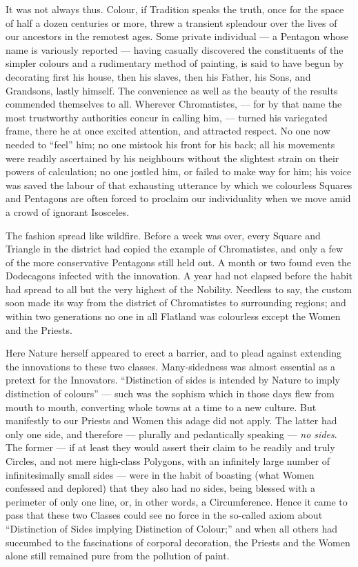 \documentclass[10pt, kindle, oneside]{kindle}
\begin{document}
It was not always thus. Colour, if Tradition speaks the truth, once for the
space of half a dozen centuries or more, threw a transient splendour over the
lives of our ancestors in the remotest ages. Some private individual --- a
Pentagon whose name is variously reported --- having casually discovered the
constituents of the simpler colours and a rudimentary method of painting, is
said to have begun by decorating first his house, then his slaves, then his
Father, his Sons, and Grandsons, lastly himself. The convenience as well as
the beauty of the results commended themselves to all. Wherever Chromatistes,
--- for by that name the most trustworthy authorities concur in calling him, ---
turned his variegated frame, there he at once excited attention, and attracted
respect. No one now needed to ``feel'' him; no one mistook his front for his
back; all his movements were readily ascertained by his neighbours without the
slightest strain on their powers of calculation; no one jostled him, or failed
to make way for him; his voice was saved the labour of that exhausting
utterance by which we colourless Squares and Pentagons are often forced to
proclaim our individuality when we move amid a crowd of ignorant Isosceles.

The fashion spread like wildfire. Before a week was over, every Square and
Triangle in the district had copied the example of Chromatistes, and only a
few of the more conservative Pentagons still held out. A month or two found
even the Dodecagons infected with the innovation. A year had not elapsed
before the habit had spread to all but the very highest of the Nobility.
Needless to say, the custom soon made its way from the district of
Chromatistes to surrounding regions; and within two generations no one in all
Flatland was colourless except the Women and the Priests.

Here Nature herself appeared to erect a barrier, and to plead against
extending the innovations to these two classes. Many-sidedness was almost
essential as a pretext for the Innovators. ``Distinction of sides is intended
by Nature to imply distinction of colours'' --- such was the sophism which in
those days flew from mouth to mouth, converting whole towns at a time to a new
culture. But manifestly to our Priests and Women this adage did not apply. The
latter had only one side, and therefore --- plurally and pedantically speaking ---
\emph{no sides}. The former --- if at least they would assert their claim to be readily
and truly Circles, and not mere high-class Polygons, with an infinitely large
number of infinitesimally small sides --- were in the habit of boasting (what
Women confessed and deplored) that they also had no sides, being blessed with
a perimeter of only one line, or, in other words, a Circumference. Hence it
came to pass that these two Classes could see no force in the so-called axiom
about ``Distinction of Sides implying Distinction of Colour;'' and when all
others had succumbed to the fascinations of corporal decoration, the Priests
and the Women alone still remained pure from the pollution of paint.
\end{document}
